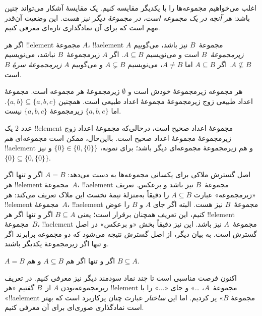 \documentclass[../../../include/open-logic-section]{subfiles}
\begin{document}

\begin{explain}
اغلب می‌خواهیم مجموعه‌ها را با یکدیگر مقایسه کنیم. یک مقایسهٔ آشکار
می‌تواند چنین باشد: \emph{هر آنچه در یک مجموعه است، در مجموعهٔ دیگر
نیز هست}. این وضعیت آن‌قدر مهم است که برای آن نمادگذاری تازه‌ای
معرفی کنیم.
\end{explain}

\begin{defn}[زیرمجموعه]
اگر هر !!{element} مجموعهٔ $A$، !!a{element} مجموعهٔ~$B$ نیز باشد،
می‌گوییم $A$ \emph{زیرمجموعهٔ}~$B$ است و می‌نویسیم $A \subseteq B$.
اگر $A$ زیرمجموعهٔ~$B$ نباشد، می‌نویسیم $A \not\subseteq B$.
اگر $A \subseteq B$ اما $A \neq B$، می‌نویسیم $A \subsetneq B$ و
می‌گوییم $A$ \emph{زیرمجموعهٔ سرهٔ} $B$ است.
\end{defn}

\begin{ex}
هر مجموعه زیرمجموعهٔ خودش است و $\emptyset$ زیرمجموعهٔ هر مجموعه است.
مجموعهٔ اعداد طبیعی زوج زیرمجموعهٔ مجموعهٔ اعداد طبیعی است. همچنین
$\{ a, b \} \subseteq \{ a, b, c \}$. اما $\{ a, b, e
\}$ زیرمجموعهٔ $\{ a, b, c \}$ نیست.
\end{ex}

\begin{ex}
عدد $2$ یک !!{element} مجموعهٔ اعداد صحیح است، درحالی‌که مجموعهٔ
اعداد زوج زیرمجموعهٔ مجموعهٔ اعداد صحیح است. بااین‌حال، ممکن است
مجموعه‌ای \emph{هم} !!a{element} و هم زیرمجموعهٔ مجموعه‌ای دیگر باشد؛
برای نمونه، $\{0\} \in \{0, \{0\}\}$ و نیز $\{0\} \subseteq \{0,
\{0\}\}$.
\end{ex}

اصل گسترش ملاکی برای یکسانی مجموعه‌ها به دست می‌دهد: $A = B$ اگر و
تنها اگر هر !!{element} مجموعهٔ~$A$، !!a{element} مجموعهٔ~$B$ نیز باشد
و برعکس. تعریف «زیرمجموعه» عبارت $A \subseteq B$ را دقیقاً به‌منزلهٔ
نیمهٔ نخست این ملاک تعریف می‌کند: هر !!{element} مجموعهٔ~$A$،
!!a{element} مجموعهٔ~$B$ نیز هست. البته اگر جای $A$ و $B$ را عوض کنیم،
این تعریف همچنان برقرار است؛ یعنی $B \subseteq A$ اگر و تنها اگر هر
!!{element} مجموعهٔ~$B$، !!a{element} مجموعهٔ~$A$ نیز باشد. این نیز
دقیقاً بخش «و برعکس» در اصل گسترش است. به بیان دیگر، از اصل گسترش
نتیجه می‌شود که دو مجموعه برابرند اگر و تنها اگر زیرمجموعهٔ یکدیگر باشند.

\begin{prop}
$A = B$ اگر و تنها اگر هم $A \subseteq B$ و هم $B \subseteq A$.
\end{prop}

اکنون فرصت مناسبی است تا چند نماد سودمند دیگر نیز معرفی کنیم. در تعریف
زیرمجموعه‌بودن $A$ از~$B$ گفتیم «هر !!{element} مجموعهٔ~$A$، \dots»
و جای «$\dots$» را با «!!a{element} مجموعهٔ $B$» پر کردیم. اما این
\emph{ساختار} عبارت چنان پرکاربرد است که بهتر است نمادگذاری صوری‌ای
برای آن معرفی کنیم.
\end{document}

